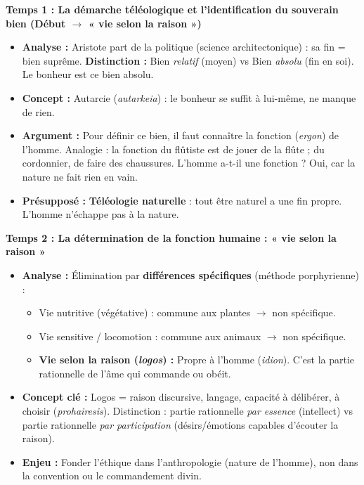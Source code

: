 \documentclass[11pt]{article}
\newcommand{\cle}[1]{{\popxbold\color{popdark}#1}}
\begin{document}
\begin{exoresolu}
\textbf{Temps 1 : La démarche téléologique et l'identification du souverain bien (Début $\rightarrow$ « vie selon la raison »)}
\begin{itemize}
    \item \textbf{Analyse :} Aristote part de la \cle{politique} (science architectonique) : sa fin = bien suprême. \textbf{Distinction :} Bien \emph{relatif} (moyen) vs Bien \emph{absolu} (fin en soi). Le bonheur est ce bien absolu.
    \item \textbf{Concept :} \cle{Autarcie} (\emph{autarkeia}) : le bonheur se suffit à lui-même, ne manque de rien.
    \item \textbf{Argument :} Pour définir ce bien, il faut connaître la \cle{fonction} (\emph{ergon}) de l'homme. Analogie : la fonction du flûtiste est de jouer de la flûte ; du cordonnier, de faire des chaussures. L'homme a-t-il une fonction ? Oui, car la nature ne fait rien en vain.
    \item \textbf{Présupposé :} \textbf{Téléologie naturelle} : tout être naturel a une fin propre. L'homme n'échappe pas à la nature.
\end{itemize}

\textbf{Temps 2 : La détermination de la fonction humaine : « vie selon la raison »}
\begin{itemize}
    \item \textbf{Analyse :} Élimination par \textbf{différences spécifiques} (méthode porphyrienne) :
    \begin{itemize}
        \item Vie nutritive (végétative) : commune aux plantes $\rightarrow$ non spécifique.
        \item Vie sensitive / locomotion : commune aux animaux $\rightarrow$ non spécifique.
        \item \textbf{Vie selon la raison (\emph{logos}) :} \cle{Propre à l'homme} (\emph{idion}). C'est la partie rationnelle de l'âme qui commande ou obéit.
    \end{itemize}
    \item \textbf{Concept clé :} \cle{Logos} = raison discursive, langage, capacité à délibérer, à choisir (\emph{prohairesis}). Distinction : partie rationnelle \emph{par essence} (intellect) vs partie rationnelle \emph{par participation} (désirs/émotions capables d'écouter la raison).
    \item \textbf{Enjeu :} Fonder l'éthique dans l'anthropologie (nature de l'homme), non dans la convention ou le commandement divin.
\end{itemize}


\end{exoresolu}
\end{document}
